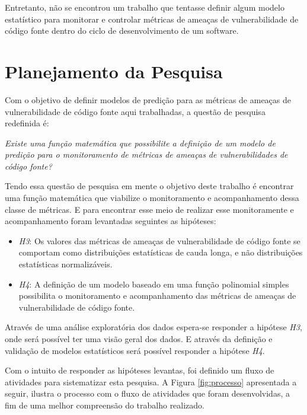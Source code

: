 Entretanto, não se encontrou um trabalho que tentasse definir algum modelo
estatístico para monitorar e controlar métricas de ameaças de vulnerabilidade de
código fonte dentro do ciclo de desenvolvimento de um software.




\section{Planejamento da Pesquisa}\label{metodologia:planejamentopesquisa}

Com o objetivo de definir modelos de predição para as métricas de ameaças de
vulnerabilidade de código fonte aqui trabalhadas, a questão de pesquisa
redefinida é:

\begin{center}
  \textit{Existe uma função matemática que possibilite a definição de um modelo de
  predição para o monitoramento de métricas de ameaças de vulnerabilidades de
  código fonte?}
\end{center}

Tendo essa questão de pesquisa em mente o objetivo deste trabalho é encontrar
uma função matemática que viabilize o monitoramento e acompanhamento dessa classe de
métricas. E para encontrar esse meio de realizar esse monitoramente e
acompanhamento foram levantadas seguintes as hipóteses:

\begin{itemize}\label{hipoteses2}
  \item \textit{H3}: Os valores das métricas de ameaças de vulnerabilidade de
    código fonte se comportam como distribuições estatísticas de cauda longa, e
    não distribuições estatísticas normalizáveis.

  \item \textit{H4}: A definição de um modelo baseado em uma função polinomial
   simples possibilita o monitoramento e acompanhamento das métricas de ameaças
   de vulnerabilidade de código fonte.
\end{itemize}

Através de uma análise exploratória dos dados espera-se responder a hipótese
\textit{H3}, onde será possível ter uma visão geral dos dados. E através da
definição e validação de modelos estatísticos será possível responder a hipótese
\textit{H4}.

Com o intuito de responder as hipóteses levantas, foi definido um fluxo de
atividades para sistematizar esta pesquisa. A Figura \ref{fig:processo}
apresentada a seguir, ilustra o processo com o fluxo de atividades que foram
desenvolvidas, a fim de uma melhor compreensão do trabalho realizado.

